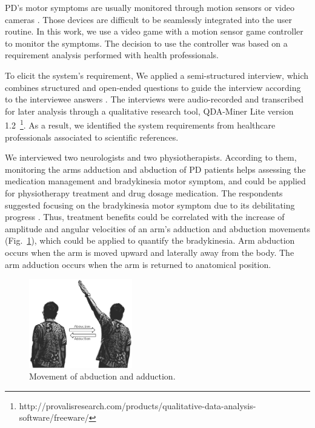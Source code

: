 \documentclass[10pt, conference, compsocconf]{IEEEtran}
\begin{document}
PD's motor symptoms are usually monitored through motion sensors or video cameras  \cite{cbmshandwriting2015}. Those devices are difficult to be seamlessly integrated into the user routine. In this work, we use a video game with a motion sensor game controller to monitor the symptoms. The decision to use the controller was based on a requirement analysis performed with health professionals. 

To elicit the system's requirement, We applied a semi-structured interview, which combines structured and open-ended questions to guide the interview according to the interviewee answers \cite{practical_guide_re2012}. The interviews were audio-recorded and transcribed for later analysis through a qualitative research tool, QDA-Miner Lite version 1.2~\footnote{http://provalisresearch.com/products/qualitative-data-analysis-software/freeware/}.  As a result, we identified the system requirements from healthcare professionals associated to scientific references.

We interviewed two neurologists and two physiotherapists. According to them, monitoring the arms adduction and abduction of PD patients helps assessing the medication management and bradykinesia motor symptom, and could be applied for physiotherapy treatment and drug dosage medication. The respondents suggested focusing on the bradykinesia motor symptom due to its debilitating progress \cite{national2006parkinson,ambulatory2010}. Thus, treatment benefits could be correlated with the increase of amplitude and angular velocities of an arm's adduction and abduction movements (Fig.~\ref{fig:abduction}), which could be applied to quantify the bradykinesia. Arm abduction occurs when the arm is moved upward and laterally away from the body. The arm adduction occurs when the arm is returned to anatomical position. 


\begin{figure}[!htb]
  \centering
  \includegraphics[width=0.4\textwidth]{./img/movaddcutctionartist.png}
  \caption{Movement of abduction and adduction.}
  \label{fig:abduction}
\end{figure}
\end{document}
